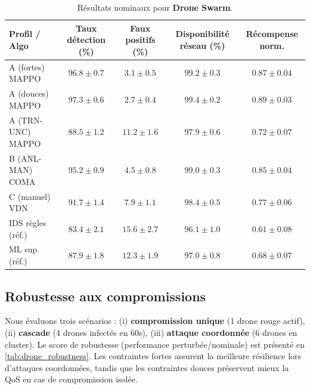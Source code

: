 \begin{table}[h!]
  \centering
  \caption{Résultats nominaux pour \textbf{Drone Swarm}.}
  \label{tab:drone_nominal}
  \renewcommand{\arraystretch}{1.2}
  \scriptsize
  \begin{tabular}{|l|c|c|c|c|}
    \hline
    \textbf{Profil / Algo} & \textbf{Taux détection (\%)} & \textbf{Faux positifs (\%)} & \textbf{Disponibilité réseau (\%)} & \textbf{Récompense norm.} \\
    \hline
    A (fortes) MAPPO       & $96.8 \pm 0.7$               & $3.1 \pm 0.5$               & $99.2 \pm 0.3$                     & $0.87 \pm 0.04$           \\
    A (douces) MAPPO       & $\mathbf{97.3 \pm 0.6}$      & $\mathbf{2.7 \pm 0.4}$      & $\mathbf{99.4 \pm 0.2}$            & $\mathbf{0.89 \pm 0.03}$  \\
    A (TRN-UNC) MAPPO      & $88.5 \pm 1.2$               & $11.2 \pm 1.6$              & $97.9 \pm 0.6$                     & $0.72 \pm 0.07$           \\
    \hline
    B (ANL-MAN) COMA       & $95.2 \pm 0.9$               & $4.5 \pm 0.8$               & $99.0 \pm 0.3$                     & $0.85 \pm 0.04$           \\
    C (manuel) VDN         & $91.7 \pm 1.4$               & $7.9 \pm 1.1$               & $98.4 \pm 0.5$                     & $0.77 \pm 0.06$           \\
    \hline
    IDS règles (réf.)      & $83.4 \pm 2.1$               & $15.6 \pm 2.7$              & $96.1 \pm 1.0$                     & $0.61 \pm 0.08$           \\
    ML sup. (réf.)         & $87.9 \pm 1.8$               & $12.3 \pm 1.9$              & $97.0 \pm 0.8$                     & $0.68 \pm 0.07$           \\
    \hline
  \end{tabular}
\end{table}

\subsection*{Robustesse aux compromissions}

Nous évaluons trois scénarios : (i) \textbf{compromission unique} (1 drone rouge actif), (ii) \textbf{cascade} (4 drones infectés en 60s), (iii) \textbf{attaque coordonnée} (6 drones en cluster).
Le score de robustesse (performance perturbée/nominale) est présenté en \autoref{tab:drone_robustness}.
Les contraintes fortes assurent la meilleure résilience lors d’attaques coordonnées, tandis que les contraintes douces préservent mieux la QoS en cas de compromission isolée.

